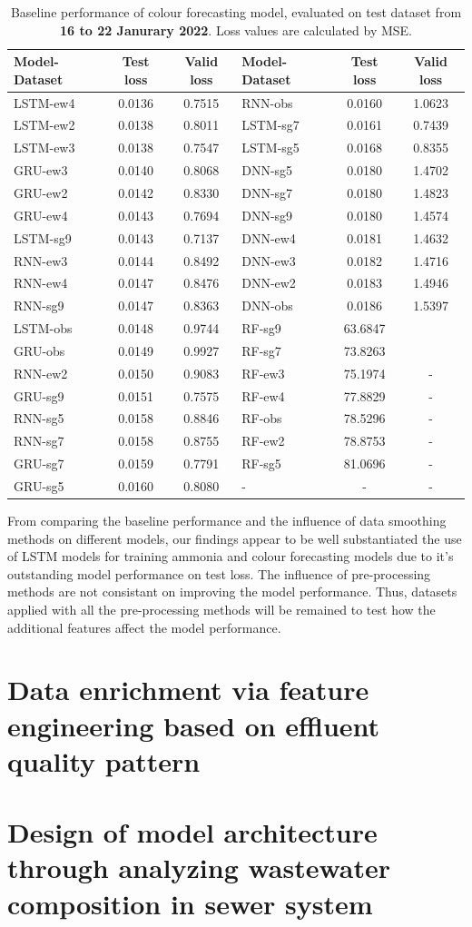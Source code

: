 \begin{table}[!ht]
  \centering
  \caption{Baseline performance of colour forecasting model, evaluated on test dataset from \textbf{16 to 22 Janurary 2022}. Loss values are calculated by MSE.}\label{tab:baseline-result-jan-colour}
  \begin{NiceTabular}{lcclcc}
      \toprule
      Model-Dataset & Test loss & Valid loss & Model-Dataset & Test loss & Valid loss \\
      \midrule
      LSTM-ew4 & 0.0136 &0.7515&RNN-obs  & 0.0160 &1.0623 \\
      LSTM-ew2 & 0.0138 &0.8011&LSTM-sg7 & 0.0161 &0.7439 \\
      LSTM-ew3 & 0.0138 &0.7547&LSTM-sg5 & 0.0168 &0.8355 \\
      GRU-ew3  & 0.0140 &0.8068&DNN-sg5  & 0.0180 &1.4702 \\
      GRU-ew2  & 0.0142 &0.8330&DNN-sg7  & 0.0180 &1.4823 \\
      GRU-ew4  & 0.0143 &0.7694&DNN-sg9  & 0.0180 &1.4574 \\
      LSTM-sg9 & 0.0143 &0.7137&DNN-ew4  & 0.0181 &1.4632 \\
      RNN-ew3  & 0.0144 &0.8492&DNN-ew3  & 0.0182 &1.4716 \\
      RNN-ew4  & 0.0147 &0.8476&DNN-ew2  & 0.0183 &1.4946 \\
      RNN-sg9  & 0.0147 &0.8363&DNN-obs  & 0.0186 &1.5397 \\
      LSTM-obs & 0.0148 &0.9744&RF-sg9   & 63.6847& \\
      GRU-obs  & 0.0149 &0.9927&RF-sg7   & 73.8263& \\
      RNN-ew2  & 0.0150 &0.9083&RF-ew3   & 75.1974&- \\
      GRU-sg9  & 0.0151 &0.7575&RF-ew4   & 77.8829&- \\
      RNN-sg5  & 0.0158 &0.8846&RF-obs   & 78.5296&- \\
      RNN-sg7  & 0.0158 &0.8755&RF-ew2   & 78.8753&- \\
      GRU-sg7  & 0.0159 &0.7791&RF-sg5   & 81.0696&- \\
      GRU-sg5  & 0.0160 &0.8080&    -    &     -  &- \\
      \bottomrule
  \end{NiceTabular}
\end{table}

From comparing the baseline performance and the influence of data smoothing methods on different models, our findings appear to be well substantiated the use of LSTM models for training ammonia and colour forecasting models due to it's outstanding model performance on test loss. The influence of pre-processing methods are not consistant on improving the model performance. Thus, datasets applied with all the pre-processing methods will be remained to test how the additional features affect the model performance.

\section{Data enrichment via feature engineering based on effluent quality pattern}



\section{Design of model architecture through analyzing wastewater composition in sewer system}
